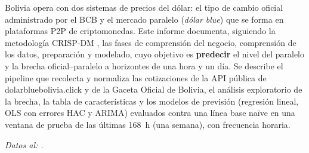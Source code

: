 Bolivia opera con dos sistemas de precios del dólar: el tipo de cambio
oficial administrado por el BCB y el mercado paralelo (\emph{dólar blue})
que se forma en plataformas P2P de criptomonedas. Este informe documenta,
siguiendo la metodología CRISP-DM \cite{chapman2000crisp},
las fases de comprensión del negocio, comprensión de los datos, preparación
y modelado, cuyo objetivo es \textbf{predecir} el nivel del paralelo y la
brecha oficial--paralelo a horizontes de una hora y un día. Se describe el pipeline
que recolecta y normaliza las cotizaciones de la API pública de
dolarbluebolivia.click y de la Gaceta Oficial de Bolivia, el análisis
exploratorio de la brecha, la tabla de características y los modelos de
previsión (regresión lineal, OLS con errores HAC y ARIMA) evaluados contra
una línea base naïve en una ventana de prueba de las últimas 168~h (una semana), con
frecuencia horaria.

\medskip
\noindent\textit{Datos al: \unskip.}
